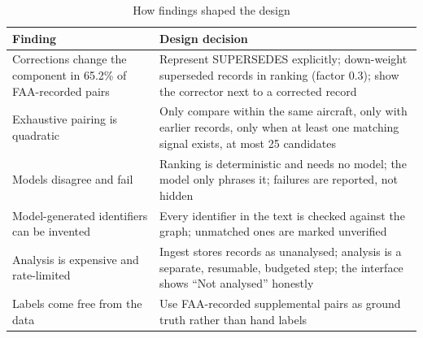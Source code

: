 \begin{table}[H]
\centering
\caption{How findings shaped the design}
\label{tab:findings-design}
\small
\begin{tabularx}{\textwidth}{@{}L L@{}}
\toprule
Finding & Design decision \\
\midrule
Corrections change the component in 65.2\% of FAA-recorded pairs & Represent SUPERSEDES explicitly; down-weight superseded records in ranking (factor 0.3); show the corrector next to a corrected record \\
Exhaustive pairing is quadratic & Only compare within the same aircraft, only with earlier records, only when at least one matching signal exists, at most 25 candidates \\
Models disagree and fail & Ranking is deterministic and needs no model; the model only phrases it; failures are reported, not hidden \\
Model-generated identifiers can be invented & Every identifier in the text is checked against the graph; unmatched ones are marked unverified \\
Analysis is expensive and rate-limited & Ingest stores records as unanalysed; analysis is a separate, resumable, budgeted step; the interface shows ``Not analysed'' honestly \\
Labels come free from the data & Use FAA-recorded supplemental pairs as ground truth rather than hand labels \\
\bottomrule
\end{tabularx}
\end{table}

